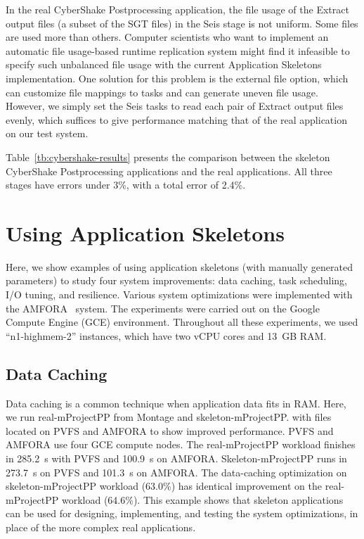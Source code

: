 \documentclass[preprint,12pt]{elsarticle}
\newcommand{\katznote}[1]{ {\textcolor{blue}    { ***Dan:   #1 }}}
\newcommand{\zhaonote}[1]{{\textcolor{darkgreen}{ ***Zhao:  #1 }}}
\newcommand{\katznote}[1]{}
\newcommand{\zhaonote}[1]{}
\begin{document}
In the real CyberShake Postprocessing application, the file usage of the Extract output files (a subset of the SGT files) in the Seis stage is not uniform. Some files are used more than  others. Computer scientists who want to implement an automatic file usage-based runtime 
replication system might find it infeasible to specify such unbalanced file usage with the current Application Skeletons implementation. One
solution for this problem is the external file option, which can customize file mappings to tasks and  can generate
uneven file usage.
However, we simply set the Seis tasks to read each pair of Extract output files evenly, which suffices to give performance matching that of the real application on our test system.

Table~\ref{tb:cybershake-results} presents the comparison between the skeleton CyberShake Postprocessing applications and the real applications. 
All three stages have errors under 3\%, with a total error of 2.4\%.


\section{Using Application Skeletons}\label{lb:using}
Here, we show examples of using application skeletons (with manually generated parameters) to study four system improvements: data caching, task scheduling, I/O tuning, and resilience. 
Various system optimizations were implemented with the AMFORA~\cite{AMFS2013} system. 
The experiments were carried out on the Google Compute Engine (GCE) environment. 
Throughout all these experiments, we used ``n1-highmem-2'' instances, which have two vCPU cores and 13~GB RAM. 


\subsection{Data Caching}
Data caching is a common technique when application data fits in RAM. Here, we run real-mProjectPP from Montage and skeleton-mProjectPP.
with files located on PVFS and AMFORA to show improved performance. PVFS and AMFORA use four GCE compute nodes.
The real-mProjectPP workload finishes in 285.2~s with PVFS and 100.9~s on AMFORA.
Skeleton-mProjectPP runs in 273.7~s on PVFS and 101.3~s on AMFORA.
The data-caching optimization on skeleton-mProjectPP workload (63.0\%) has identical improvement on the real-mProjectPP workload (64.6\%). This example shows that skeleton applications can be used for designing, implementing, and testing the system optimizations, in place of the more complex real applications.
\end{document}
